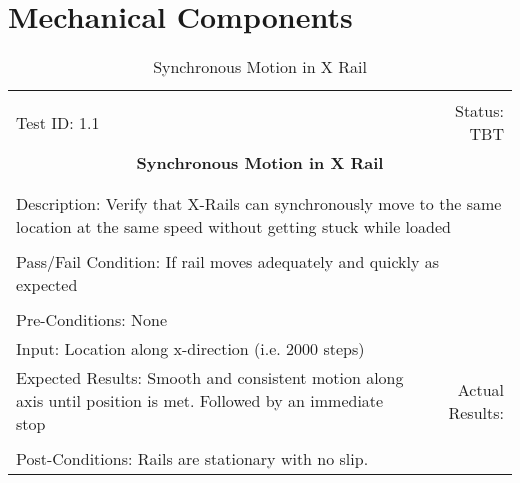 \documentclass[titlepage]{article}
\begin{document}
\section{Mechanical Components}
\begin{center}%
\begin{table}
\begin{tabular}{|l r|}\hline&\\[-2mm]
	Test ID: 1.1	&Status: TBT\\[-3mm]
	\multicolumn{2}{|c|}{\textbf{\large{Synchronous Motion in X Rail}}}\\&\\\hline&\\[-3mm]
	\multicolumn{2}{|p{\textwidth}|}{Description: Verify that X-Rails can synchronously move to the same location at the same speed without getting stuck while loaded}\\[1mm]\hline&\\[-3mm]
	\multicolumn{2}{|p{\textwidth}|}{Pass/Fail Condition: If rail moves adequately and quickly as expected}\\[1mm]\hline&\\[-3mm]
	\multicolumn{2}{|p{\textwidth}|}{Pre-Conditions: None}\\[4mm]
	\multicolumn{2}{|p{\textwidth}|}{Input: Location along x-direction (i.e. 2000 steps)}\\[2mm]\hline
	\multicolumn{1}{|p{0.49\textwidth}}{Expected Results: Smooth and consistent motion along axis until position is met. Followed by an immediate stop}	&\multicolumn{1}{|p{0.45\textwidth}|}{Actual Results:}\\\hline&\\[-3mm]
	\multicolumn{2}{|p{\textwidth}|}{Post-Conditions: Rails are stationary with no slip.}\\\hline
\end{tabular}
\caption{Synchronous Motion in X Rail}
\end{table}
\end{center}
\end{document}
